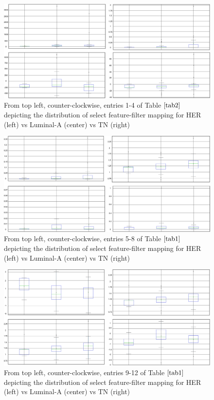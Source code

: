 \documentclass[10pt,final,1p,times,twocolumn]{elsarticle}
\begin{document}
\begin{figure}[hbt!]
\centering
\includegraphics[width=14cm]{t_1-4.png}
\caption{From top left, counter-clockwise, entries 1-4 of Table $\ref{tab2}$ depicting the distribution of select feature-filter mapping for HER (left) vs Luminal-A (center) vs TN (right)}
\label{t_1-4}
\end{figure}
\begin{figure}[hbt!]
\centering
\includegraphics[width=14cm]{t_5-8.png}
\caption{From top left, counter-clockwise, entries 5-8 of Table $\ref{tab1}$ depicting the distribution of select feature-filter mapping for HER (left) vs Luminal-A (center) vs TN (right)}
\label{t_5-8}
\end{figure}
\begin{figure}[hbt!]
\centering
\includegraphics[width=14cm]{t_9-12.png}
\caption{From top left, counter-clockwise, entries 9-12 of Table $\ref{tab1}$ depicting the distribution of select feature-filter mapping for HER (left) vs Luminal-A (center) vs TN (right)}
\label{t_9-12}
\end{figure}
\end{document}

